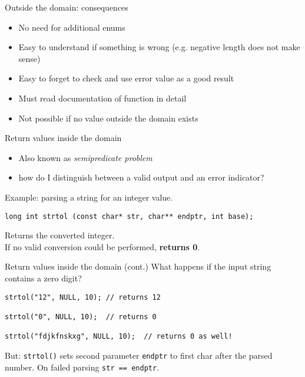 \documentclass[aspectratio=169,14pt]{beamer}
\begin{document}
\begin{frame}[fragile]{Outside the domain: consequences}
\begin{itemize}
    \item[\good] No need for additional enums
    \item[\good] Easy to understand if something is wrong (e.g. negative length does not make sense)
    \item[\bad] Easy to forget to check and use error value as a good result
    \item[\bad] Must read documentation of function in detail 
    \item[\bad] Not possible if no value outside the domain exists
\end{itemize}
\end{frame}



\begin{frame}[fragile]{Return values inside the domain}
\begin{itemize}
    \item Also known as \textit{semipredicate problem}
    \item how do I distinguish between a valid output and an error indicator?
\end{itemize}

Example: parsing a string for an integer value.

\begin{lstlisting}[style=cstyle]
long int strtol (const char* str, char** endptr, int base);
\end{lstlisting}

Returns the converted integer.\\
If no valid conversion could be performed, \textbf{returns 0}.
\end{frame}



\begin{frame}[fragile]{Return values inside the domain (cont.)}
What happens if the input string contains a zero digit?

\begin{lstlisting}[style=cstyle]
strtol("12", NULL, 10); // returns 12

strtol("0", NULL, 10);  // returns 0

strtol("fdjkfnskxg", NULL, 10);  // returns 0 as well!
\end{lstlisting}

But: \texttt{strtol()} sets second parameter \texttt{endptr} to first char after the parsed number. On failed parsing \texttt{str == endptr}.
\end{frame}
\end{document}
